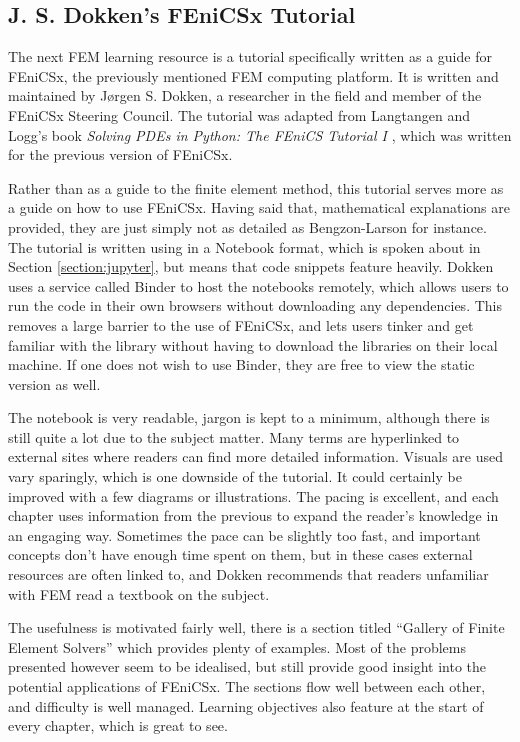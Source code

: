 \subsection{J. S. Dokken's FEniCSx Tutorial}

The next FEM learning resource is a tutorial specifically written as a guide for FEniCSx, the previously mentioned FEM computing platform. It is written and maintained by Jørgen S. Dokken, a researcher in the field and member of the FEniCSx Steering Council. The tutorial was adapted from Langtangen and Logg's book \textit{Solving PDEs in Python: The FEniCS Tutorial I} \cite{langtangen-logg}, which was written for the previous version of FEniCSx.

Rather than as a guide to the finite element method, this tutorial serves more as a guide on how to use FEniCSx. Having said that, mathematical explanations are provided, they are just simply not as detailed as Bengzon-Larson for instance. The tutorial is written using in a Notebook format, which is spoken about in Section \ref{section:jupyter}, but means that code snippets feature heavily. Dokken uses a service called Binder to host the notebooks remotely, which allows users to run the code in their own browsers without downloading any dependencies. This removes a large barrier to the use of FEniCSx, and lets users tinker and get familiar with the library without having to download the libraries on their local machine. If one does not wish to use Binder, they are free to view the static version as well.

The notebook is very readable, jargon is kept to a minimum, although there is still quite a lot due to the subject matter. Many terms are hyperlinked to external sites where readers can find more detailed information. Visuals are used vary sparingly, which is one downside of the tutorial. It could certainly be improved with a few diagrams or illustrations. The pacing is excellent, and each chapter uses information from the previous to expand the reader's knowledge in an engaging way. Sometimes the pace can be slightly too fast, and important concepts don't have enough time spent on them, but in these cases external resources are often linked to, and Dokken recommends that readers unfamiliar with FEM read a textbook on the subject.

The usefulness is motivated fairly well, there is a section titled ``Gallery of Finite Element Solvers'' which provides plenty of examples. Most of the problems presented however seem to be idealised, but still provide good insight into the potential applications of FEniCSx. The sections flow well between each other, and difficulty is well managed. Learning objectives also feature at the start of every chapter, which is great to see.

